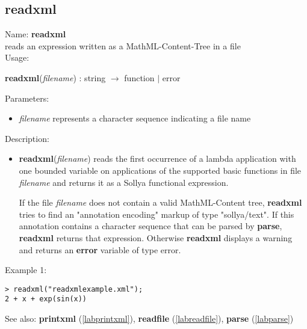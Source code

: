 \subsection{readxml}
\label{labreadxml}
\noindent Name: \textbf{readxml}\\
reads an expression written as a MathML-Content-Tree in a file\\

\noindent Usage: 
\begin{center}
\textbf{readxml}(\emph{filename}) : \textsf{string} $\rightarrow$ \textsf{function} $|$ \textsf{error}\\
\end{center}
Parameters: 
\begin{itemize}
\item \emph{filename} represents a character sequence indicating a file name
\end{itemize}
\noindent Description: \begin{itemize}

\item \textbf{readxml}(\emph{filename}) reads the first occurrence of a lambda
   application with one bounded variable on applications of the supported
   basic functions in file \emph{filename} and returns it as a Sollya
   functional expression.
    
   If the file \emph{filename} does not contain a valid MathML-Content tree,
   \textbf{readxml} tries to find an "annotation encoding" markup of type
   "sollya/text". If this annotation contains a character sequence
   that can be parsed by \textbf{parse}, \textbf{readxml} returns that expression.  Otherwise
   \textbf{readxml} displays a warning and returns an \textbf{error} variable of type
   \textsf{error}.
\end{itemize}
\noindent Example 1: 
\begin{center}\begin{minipage}{15cm}\begin{Verbatim}[frame=single]
> readxml("readxmlexample.xml");
2 + x + exp(sin(x))
\end{Verbatim}
\end{minipage}\end{center}
See also: \textbf{printxml} (\ref{labprintxml}), \textbf{readfile} (\ref{labreadfile}), \textbf{parse} (\ref{labparse})
